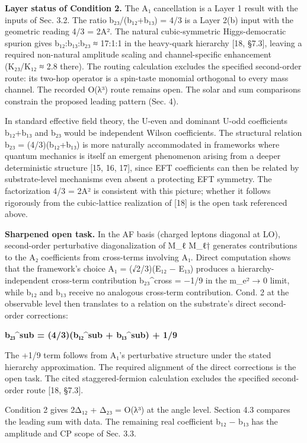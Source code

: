 \documentclass[
]{article}
\begin{document}
\textbf{Layer status of Condition 2.} The A₁ cancellation is a Layer 1
result with the inputs of Sec. 3.2. The ratio b₂₃/(b₁₂+b₁₃) = 4/3 is a
Layer 2(b) input with the geometric reading 4/3 = 2A². The natural
cubic-symmetric Higgs-democratic spurion gives b₁₂:b₁₃:b₂₃ ≈ 17:1:1 in
the heavy-quark hierarchy {[}18, §7.3{]}, leaving a required non-natural
amplitude scaling and channel-specific enhancement (K₂₃/K₁₂ ≈ 2.8
there). The routing calculation excludes the specified second-order
route: its two-hop operator is a spin-taste monomial orthogonal to every
mass channel. The recorded O(λ³) route remains open. The solar and sum
comparisons constrain the proposed leading pattern (Sec. 4).

In standard effective field theory, the U-even and dominant U-odd
coefficients b₁₂+b₁₃ and b₂₃ would be independent Wilson coefficients.
The structural relation b₂₃ = (4/3)(b₁₂+b₁₃) is more naturally
accommodated in frameworks where quantum mechanics is itself an emergent
phenomenon arising from a deeper deterministic structure {[}15, 16,
17{]}, since EFT coefficients can then be related by substrate-level
mechanisms even absent a protecting EFT symmetry. The factorization 4/3
= 2A² is consistent with this picture; whether it follows rigorously
from the cubic-lattice realization of {[}18{]} is the open task
referenced above.

\textbf{Sharpened open task.} In the AF basis (charged leptons diagonal
at LO), second-order perturbative diagonalization of M\_ℓ M\_ℓ†
generates contributions to the A₂ coefficients from cross-terms
involving A₁. Direct computation shows that the framework's choice A₁ =
(√2/3)(E₁₂ − E₁₃) produces a hierarchy-independent cross-term
contribution b₂₃\^{}cross = −1/9 in the m\_e² → 0 limit, while b₁₂ and
b₁₃ receive no analogous cross-term contribution. Cond. 2 at the
observable level then translates to a relation on the substrate's direct
second-order corrections:

\textbf{b₂₃\^{}sub = (4/3)(b₁₂\^{}sub + b₁₃\^{}sub) + 1/9}

The +1/9 term follows from A₁'s perturbative structure under the stated
hierarchy approximation. The required alignment of the direct
corrections is the open task. The cited staggered-fermion calculation
excludes the specified second-order route {[}18, §7.3{]}.

Condition 2 gives 2Δ₁₂ + Δ₂₃ = O(λ³) at the angle level. Section 4.3
compares the leading sum with data. The remaining real coefficient b₁₂ −
b₁₃ has the amplitude and CP scope of Sec. 3.3.
\end{document}
